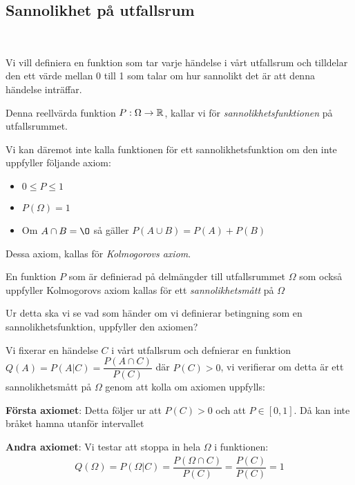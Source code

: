 \subsection{Sannolikhet på utfallsrum}\hfill\\\par
\noindent Vi vill definiera en funktion som tar varje händelse i vårt utfallsrum och tilldelar den ett värde mellan 0 till 1 som talar om hur sannolikt det är att denna händelse inträffar.\par
\noindent Denna reellvärda funktion $P:\Omega\to\mathbb{R}$, kallar vi för \textit{sannolikhetsfunktionen} på utfallsrummet.\par
\noindent Vi kan däremot inte kalla funktionen för ett sannolikhetsfunktion om den inte uppfyller följande axiom:
\par
\begin{itemize}
  \item $0\leq P\leq1$
  \item $P(\Omega) = 1$
  \item Om $A\cap B = \O$ så gäller $P(A\cup B) = P(A)+P(B)$
\end{itemize}\par
\noindent Dessa axiom, kallas för \textit{Kolmogorovs axiom}.
\par\bigskip
\noindent En funktion $P$ som är definierad på delmängder till utfallsrummet $\Omega$ som också uppfyller Kolmogorovs axiom kallas för ett \textit{sannolikhetsmått} på $\Omega$
\par\bigskip
\noindent Ur detta ska vi se vad som händer om vi definierar betingning som en sannolikhetsfunktion, uppfyller den axiomen?
\par\bigskip
\noindent Vi fixerar en händelse $C$ i vårt utfallsrum och defnierar en funktion $Q(A) = P(A|C) = \dfrac{P(A\cap C)}{P(C)}$ där $P(C)>0$, vi verifierar om detta är ett sannolikhetsmått på $\Omega$ genom att kolla om axiomen uppfylls:
\par\bigskip
\noindent\textbf{Första axiomet}: Detta följer ur att $P(C)>0$ och att $P\in[0,1]$. Då kan inte bråket hamna utanför intervallet
\par\bigskip
\noindent\textbf{Andra axiomet}: Vi testar att stoppa in hela $\Omega$ i funktionen:
\begin{equation*}
  \begin{gathered}
    Q(\Omega) = P(\Omega|C) = \dfrac{P(\Omega\cap C)}{P(C)} = \dfrac{P(C)}{P(C)}=1
  \end{gathered}
\end{equation*}
